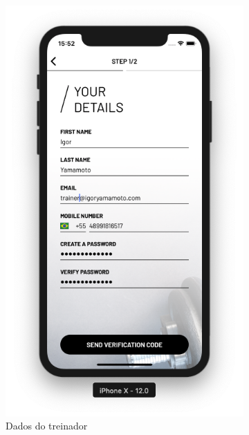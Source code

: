 \begin{figure}[h]
	\centering
    \begin{subfigure}[b]{0.4\textwidth}
        \includegraphics[width=\textwidth]{pfc/figuras/register-trainer.png}
        \caption{Dados do treinador}
        \label{fig:register-trainer-info}
    \end{subfigure}
    ~
	\begin{subfigure}[b]{0.4\textwidth}

\end{subfigure}
\end{figure}
